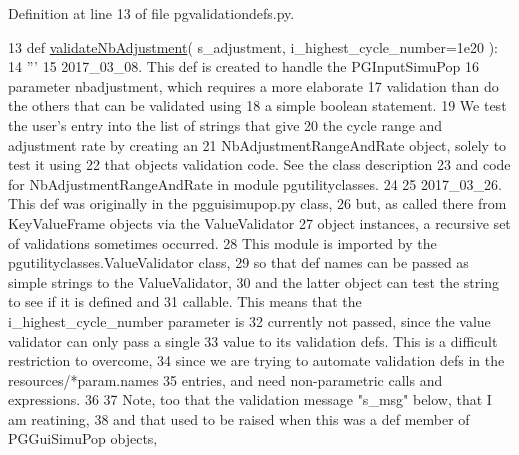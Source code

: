 Definition at line 13 of file pgvalidationdefs.\+py.


\begin{DoxyCode}
13 \textcolor{keyword}{def }\hyperlink{namespacenegui_1_1pgvalidationdefs_a4b7d8191dc9d960485de54ff057da930}{validateNbAdjustment}( s\_adjustment, i\_highest\_cycle\_number=1e20 ):
14     \textcolor{stringliteral}{'''}
15 \textcolor{stringliteral}{    2017\_03\_08. This def is created to handle the PGInputSimuPop}
16 \textcolor{stringliteral}{    parameter nbadjustment, which requires a more elaborate}
17 \textcolor{stringliteral}{    validation than do the others that can be validated using}
18 \textcolor{stringliteral}{    a simple boolean statement.}
19 \textcolor{stringliteral}{    We test the user's entry into the list of strings that give}
20 \textcolor{stringliteral}{    the cycle range and adjustment rate by creating an }
21 \textcolor{stringliteral}{    NbAdjustmentRangeAndRate object, solely to test it using}
22 \textcolor{stringliteral}{    that objects validation code.  See the class description}
23 \textcolor{stringliteral}{    and code for NbAdjustmentRangeAndRate in module pgutilityclasses.}
24 \textcolor{stringliteral}{}
25 \textcolor{stringliteral}{    2017\_03\_26.  This def was originally in the pgguisimupop.py class,}
26 \textcolor{stringliteral}{    but, as called there from KeyValueFrame objects via the ValueValidator}
27 \textcolor{stringliteral}{    object instances, a recursive set of validations sometimes occurred.}
28 \textcolor{stringliteral}{    This module is imported by the pgutilityclasses.ValueValidator class,}
29 \textcolor{stringliteral}{    so that def names can be passed as simple strings to the ValueValidator,}
30 \textcolor{stringliteral}{    and the latter object can test the string to see if it is defined and}
31 \textcolor{stringliteral}{    callable.  This means that the i\_highest\_cycle\_number parameter is }
32 \textcolor{stringliteral}{    currently not passed, since the value validator can  only pass a single}
33 \textcolor{stringliteral}{    value to its validation defs.  This is a difficult restriction to overcome,}
34 \textcolor{stringliteral}{    since we are trying to automate validation defs in the resources/*param.names}
35 \textcolor{stringliteral}{    entries, and need non-parametric calls and expressions.}
36 \textcolor{stringliteral}{}
37 \textcolor{stringliteral}{    Note, too that the validation message "s\_msg" below, that I am reatining,}
38 \textcolor{stringliteral}{    and that used to be raised when this was a def member of PGGuiSimuPop objects, }

\end{DoxyCode}
